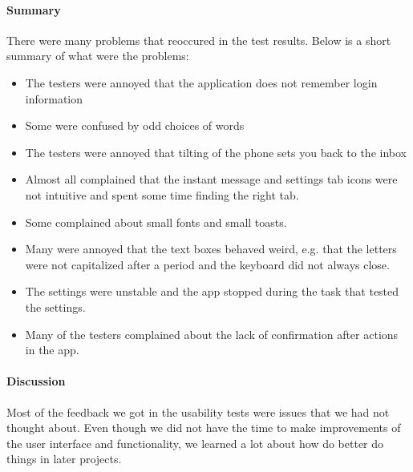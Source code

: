 		\paragraph{Summary}
			There were many problems that reoccured in the test results. Below is a short summary of what were the problems:
			\begin{itemize}
				\item{}The testers were annoyed that the application does not remember login information
				\item{}Some were confused by odd choices of words
				\item{}The testers were annoyed that tilting of the phone sets you back to the inbox
				\item{}Almost all complained that the instant message and settings tab icons were not intuitive and spent some time finding the right tab.
				\item{}Some complained about small fonts and small toasts.
				\item{}Many were annoyed that the text boxes behaved weird, e.g. that the letters were not capitalized after a period and the keyboard did not always close. 
				\item{}The settings were unstable and the app stopped during the task that tested the settings.
				\item{}Many of the testers complained about the lack of confirmation after actions in the app.
			\end{itemize}
		\paragraph{Discussion}
			Most of the feedback we got in the usability tests were issues that we had not thought about. Even though we did not have the time to make improvements of the user interface and functionality, we learned a lot about how do better do things in later projects.